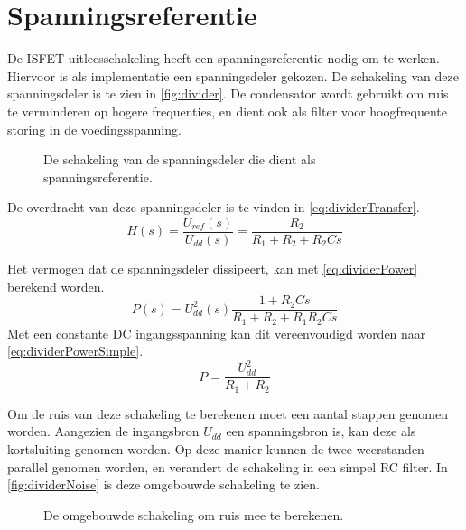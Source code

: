 \section{Spanningsreferentie}\label{sec:referenceVoltage}

De ISFET uitleesschakeling heeft een spanningsreferentie nodig om te werken.
Hiervoor is als implementatie een spanningsdeler gekozen. De schakeling van deze spanningsdeler is te zien in \autoref{fig:divider}.
De condensator wordt gebruikt om ruis te verminderen op hogere frequenties, en dient ook als filter voor hoogfrequente storing in de voedingsspanning.

\begin{figure}[ht]
    \centering
    \def\svgwidth{0.5\textwidth}
    
    \caption{De schakeling van de spanningsdeler die dient als spanningsreferentie.}
    \label{fig:divider}
\end{figure}

\noindent
De overdracht van deze spanningsdeler is te vinden in \autoref{eq:dividerTransfer}.
\begin{equation}\label{eq:dividerTransfer}
    H(s) = \frac{U_{ref}(s)}{U_{dd}(s)} = \frac{R_2}{R_1 + R_2 + R_2Cs}
\end{equation}

\noindent
Het vermogen dat de spanningsdeler dissipeert, kan met \autoref{eq:dividerPower} berekend worden.
\begin{equation}\label{eq:dividerPower}
    P(s) = U_{dd}^2(s)\frac{1+R_2Cs}{R_1 + R_2 + R_1R_2Cs}
\end{equation}
Met een constante DC ingangsspanning kan dit vereenvoudigd worden naar \autoref{eq:dividerPowerSimple}.
\begin{equation}\label{eq:dividerPowerSimple}
    P = \frac{U_{dd}^2}{R_1 + R_2}
\end{equation}

Om de ruis van deze schakeling te berekenen moet een aantal stappen genomen worden. Aangezien de ingangsbron $U_{dd}$ een spanningsbron is, kan deze als kortsluiting genomen worden. Op deze manier kunnen de twee weerstanden parallel genomen worden, en verandert de schakeling in een simpel RC filter. In \autoref{fig:dividerNoise} is deze omgebouwde schakeling te zien.

\begin{figure}[ht]
    \centering
    \def\svgwidth{0.35\textwidth}
    
    \caption{De omgebouwde schakeling om ruis mee te berekenen.}
    \label{fig:dividerNoise}
\end{figure}

